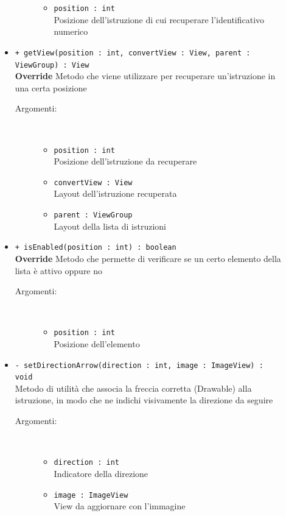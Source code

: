 \documentclass[../DefinizioneDiProdotto.tex]{subfiles}
\begin{document}
\begin{description}
\begin{itemize}
\begin{description}
\begin{itemize}
				\item \texttt{position : int}\\
				Posizione dell'istruzione di cui recuperare l'identificativo numerico\end{itemize}
		\end{description}
		\item \texttt{+ getView(position : int, convertView : View, parent : ViewGroup) : View}\\
		\textbf{Override} Metodo che viene utilizzare per recuperare un'istruzione in una certa posizione
		\begin{description}
			\item[Argomenti:] \
			\begin{itemize}
				\item \texttt{position : int}\\
				Posizione dell'istruzione da recuperare\item \texttt{convertView : View}\\
				Layout dell'istruzione recuperata\item \texttt{parent : ViewGroup}\\
				Layout della lista di istruzioni\end{itemize}
		\end{description}
		\item \texttt{+ isEnabled(position : int) : boolean}\\
		\textbf{Override} Metodo che permette di verificare se un certo elemento della lista è attivo oppure no
		\begin{description}
			\item[Argomenti:] \
			\begin{itemize}
				\item \texttt{position : int}\\
				Posizione dell'elemento\end{itemize}
		\end{description}
		\item \texttt{- setDirectionArrow(direction : int, image : ImageView) : void}\\
		Metodo di utilità che associa la freccia corretta (Drawable) alla istruzione, in modo che ne indichi visivamente la direzione da seguire
		\begin{description}
			\item[Argomenti:] \
			\begin{itemize}
				\item \texttt{direction : int}\\
				Indicatore della direzione\item \texttt{image : ImageView}\\
				View da aggiornare con l'immagine\end{itemize}
		\end{description}
	\end{itemize}
\end{description}
\end{document}

